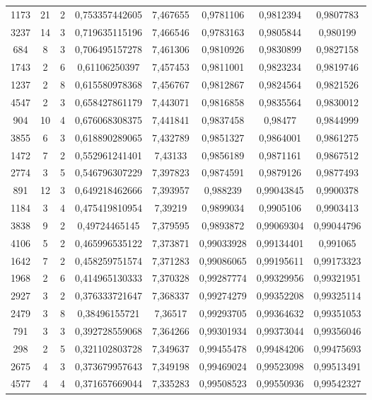 \begin{longtable}{|c|c|c|c|c|c|c|c|}
1173 & 21 & 2 & 0,753357442605 & 7,467655 & 0,9781106 & 0,9812394 & 0,9807783 \\
3237 & 14 & 3 & 0,719635115196 & 7,466546 & 0,9783163 & 0,9805844 & 0,980199 \\
684 & 8 & 3 & 0,706495157278 & 7,461306 & 0,9810926 & 0,9830899 & 0,9827158 \\
1743 & 2 & 6 & 0,61106250397 & 7,457453 & 0,9811001 & 0,9823234 & 0,9819746 \\
1237 & 2 & 8 & 0,615580978368 & 7,456767 & 0,9812867 & 0,9824564 & 0,9821526 \\
4547 & 2 & 3 & 0,658427861179 & 7,443071 & 0,9816858 & 0,9835564 & 0,9830012 \\
904 & 10 & 4 & 0,676068308375 & 7,441841 & 0,9837458 & 0,98477 & 0,9844999 \\
3855 & 6 & 3 & 0,618890289065 & 7,432789 & 0,9851327 & 0,9864001 & 0,9861275 \\
1472 & 7 & 2 & 0,552961241401 & 7,43133 & 0,9856189 & 0,9871161 & 0,9867512 \\
2774 & 3 & 5 & 0,546796307229 & 7,397823 & 0,9874591 & 0,9879126 & 0,9877493 \\
891 & 12 & 3 & 0,649218462666 & 7,393957 & 0,988239 & 0,99043845 & 0,9900378 \\
1184 & 3 & 4 & 0,475419810954 & 7,39219 & 0,9899034 & 0,9905106 & 0,9903413 \\
3838 & 9 & 2 & 0,49724465145 & 7,379595 & 0,9893872 & 0,99069304 & 0,99044796 \\
4106 & 5 & 2 & 0,465996535122 & 7,373871 & 0,99033928 & 0,99134401 & 0,991065 \\
1642 & 7 & 2 & 0,458259751574 & 7,371283 & 0,99086065 & 0,99195611 & 0,99173323 \\
1968 & 2 & 6 & 0,414965130333 & 7,370328 & 0,99287774 & 0,99329956 & 0,99321951 \\
2927 & 3 & 2 & 0,376333721647 & 7,368337 & 0,99274279 & 0,99352208 & 0,99325114 \\
2479 & 3 & 8 & 0,38496155721 & 7,36517 & 0,99293705 & 0,99364632 & 0,99351053 \\
791 & 3 & 3 & 0,392728559068 & 7,364266 & 0,99301934 & 0,99373044 & 0,99356046 \\
298 & 2 & 5 & 0,321102803728 & 7,349637 & 0,99455478 & 0,99484206 & 0,99475693 \\
2675 & 4 & 3 & 0,373679957643 & 7,349198 & 0,99469024 & 0,99523098 & 0,99513491 \\
4577 & 4 & 4 & 0,371657669044 & 7,335283 & 0,99508523 & 0,99550936 & 0,99542327 \\

\end{longtable}
